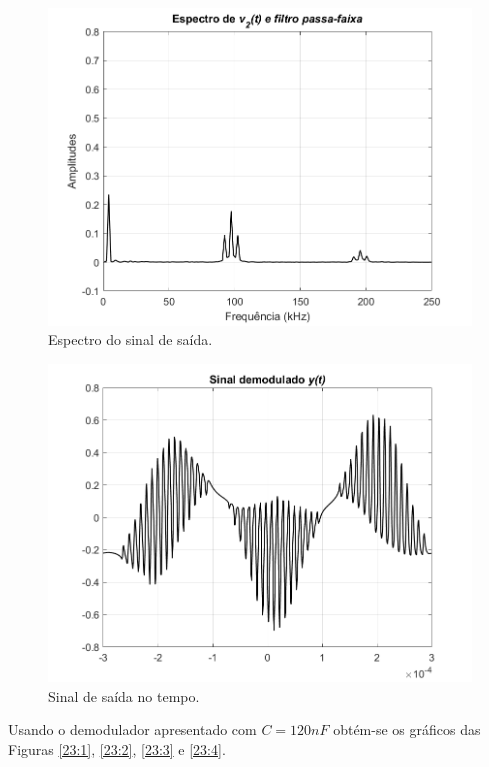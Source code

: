 \documentclass[a4paper,12pt,oneside,openany,table,xcdraw]{article}
\begin{document}
\vspace{0.3cm}
\begin{figure}[H]
\centering
\includegraphics[width=\textwidth]{ex2_espectro_saida_2}
\caption{Espectro do sinal de saída.}
\label{22:3}
\end{figure}

\vspace{0.3cm}
\begin{figure}[H]
\centering
\includegraphics[width=\textwidth]{ex2_saida_2}
\caption{Sinal de saída no tempo.}
\label{22:4}
\end{figure}

\newpage
Usando o demodulador apresentado com $C=120nF$ obtém-se os gráficos das Figuras \ref{23:1}, \ref{23:2}, \ref{23:3} e  \ref{23:4}.
\end{document}
